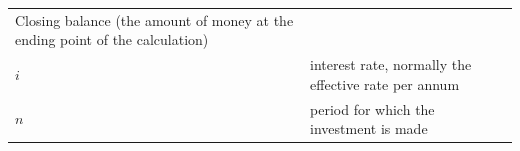 \begin{itemize}[noitemsep]
{\begin{tabular}[t]{|l|l|}
        Closing balance (the amount of money at the ending point of the calculation)%
     \tabularnewline\cline{1-1}\cline{2-2}
                  $i$
                 &
        interest rate, normally the effective rate per annum%
     \tabularnewline\cline{1-1}\cline{2-2}
                  $n$
                 &
        period for which the investment is made%
     \tabularnewline\cline{1-1}\cline{2-2}
    \end{tabular}} %
\end{itemize}
